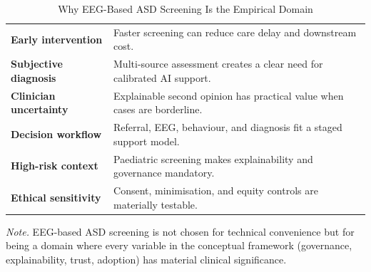 {\tablestripes\tablefontsize
{}
\begin{xltabular}{\textwidth}{@{} >{\raggedright\arraybackslash}p{3.0cm} L @{}}
\caption[Why EEG/ASD as the Empirical Domain]{Why EEG-Based ASD Screening Is the Empirical Domain}\label{tab:eeg_why_domain} \\
\toprule
{} &  \\
\midrule
\endfirsthead
\endhead
\bottomrule
\endlastfoot
\textbf{Early intervention}      & Faster screening can reduce care delay and downstream cost. \\
\textbf{Subjective diagnosis}    & Multi-source assessment creates a clear need for calibrated AI support. \\
\textbf{Clinician uncertainty}   & Explainable second opinion has practical value when cases are borderline. \\
\textbf{Decision workflow}       & Referral, EEG, behaviour, and diagnosis fit a staged support model. \\
\textbf{High-risk context}       & Paediatric screening makes explainability and governance mandatory. \\
\textbf{Ethical sensitivity}     & Consent, minimisation, and equity controls are materially testable. \\
\end{xltabular}}
\vspace{0.4em}
\noindent\textit{Note.} EEG-based ASD screening is not chosen for technical convenience but for being a domain where every variable in the conceptual framework (governance, explainability, trust, adoption) has material clinical significance.

